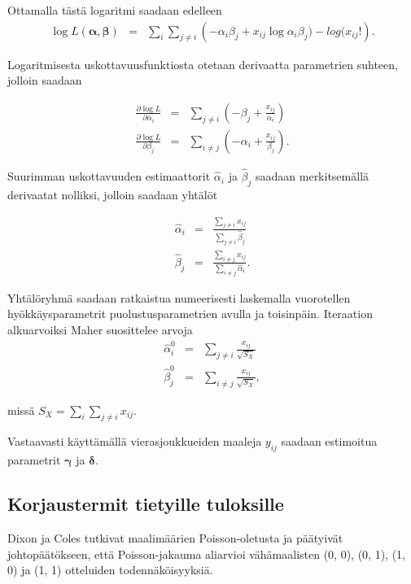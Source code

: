 \documentclass[a4paper,finnish,titlepage,12pt]{article}
\begin{document}
Ottamalla tästä logaritmi saadaan edelleen
\begin{eqnarray*}
	\log{L(\mathbf{\alpha}, \mathbf{\beta})} &=& \sum_{i} \sum_{j \ne i} (-\alpha_i \beta_j + x_{ij} \log{\alpha_i \beta_j) - log(x_{ij}!}).
\end{eqnarray*}

Logaritmisesta uskottavuusfunktiosta otetaan derivaatta parametrien suhteen, jolloin saadaan

\begin{eqnarray*}
	\frac{\partial \log{L}}{\partial \alpha_i} &=& \sum_{j \ne i} (-\beta_j + \frac{x_{ij}}{\alpha_i}) \\
	\frac{\partial \log{L}}{\partial \beta_j} &=& \sum_{i \ne j} (-\alpha_i + \frac{x_{ij}}{\beta_j}).
\end{eqnarray*}

Suurimman uskottavuuden estimaattorit $\hat{\alpha}_i$ ja $\hat{\beta}_j$ saadaan merkitsemällä derivaatat nolliksi, jolloin saadaan yhtälöt

\begin{eqnarray*}
	\hat{\alpha}_i &=& \frac{\sum_{j \ne i} x_{ij}}{\sum_{j \ne i} \hat{\beta}_j} \\
	\hat{\beta}_j &=& \frac{\sum_{i \ne j} x_{ij}}{\sum_{i \ne j} \hat{\alpha}_i}.
\end{eqnarray*}

Yhtälöryhmä saadaan ratkaistua numeerisesti laskemalla vuorotellen hyökkäysparametrit puolustusparametrien avulla ja toisinpäin. Iteraation alkuarvoiksi Maher suosittelee arvoja
\begin{eqnarray}
	\hat{\alpha}_i^0 &=& \sum_{j \ne i} \frac{x_{ij}}{\sqrt{S_X}} \\
	\hat{\beta}_j^0 &=& \sum_{i \ne j} \frac{x_{ij}}{\sqrt{S_X}},
\end{eqnarray}

missä $S_X = \sum_{i} \sum_{j \ne i} x_{ij}$.

Vastaavasti käyttämällä vierasjoukkueiden maaleja $y_{ij}$ saadaan estimoitua parametrit $\mathbf{\gamma}$ ja $\mathbf{\delta}$.



\subsection{Korjaustermit tietyille tuloksille}
Dixon ja Coles \cite{dixoncoles} tutkivat maalimäärien Poisson-oletusta ja päätyivät johtopäätökseen, että Poisson-jakauma aliarvioi vähämaalisten (0, 0), (0, 1), (1, 0) ja (1, 1) otteluiden todennäköisyyksiä. 
\end{document}
